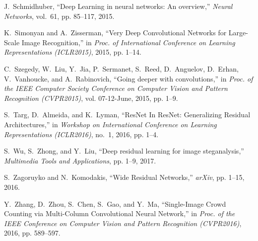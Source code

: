 \documentclass[journal]{IEEEtran}
\begin{document}
\begin{thebibliography}{10}
J.~Schmidhuber, ``{Deep Learning in neural networks: An overview},''
  \emph{Neural Networks}, vol.~61, pp. 85--117, 2015.

K.~Simonyan and A.~Zisserman, ``{Very Deep Convolutional Networks for
  Large-Scale Image Recognition},'' in \emph{Proc. of International Conference
  on Learning Representations (ICLR2015)}, 2015, pp. 1--14.

C.~Szegedy, W.~Liu, Y.~Jia, P.~Sermanet, S.~Reed, D.~Anguelov, D.~Erhan,
  V.~Vanhoucke, and A.~Rabinovich, ``{Going deeper with convolutions},'' in
  \emph{Proc. of the IEEE Computer Society Conference on Computer Vision and
  Pattern Recognition (CVPR2015)}, vol. 07-12-June, 2015, pp. 1--9.

S.~Targ, D.~Almeida, and K.~Lyman, ``{ResNet In ResNet: Generalizing Residual
  Architectures},'' in \emph{Workshop on International Conference on Learning
  Representations (ICLR2016)}, no.~1, 2016, pp. 1--4.

S.~Wu, S.~Zhong, and Y.~Liu, ``{Deep residual learning for image
  steganalysis},'' \emph{Multimedia Tools and Applications}, pp. 1--9, 2017.

S.~Zagoruyko and N.~Komodakis, ``{Wide Residual Networks},'' \emph{arXiv}, pp.
  1--15, 2016.

Y.~Zhang, D.~Zhou, S.~Chen, S.~Gao, and Y.~Ma, ``{Single-Image Crowd Counting
  via Multi-Column Convolutional Neural Network},'' in \emph{Proc. of the IEEE
  Conference on Computer Vision and Pattern Recognition (CVPR2016)}, 2016, pp.
  589--597.

\end{thebibliography}
\end{document}
